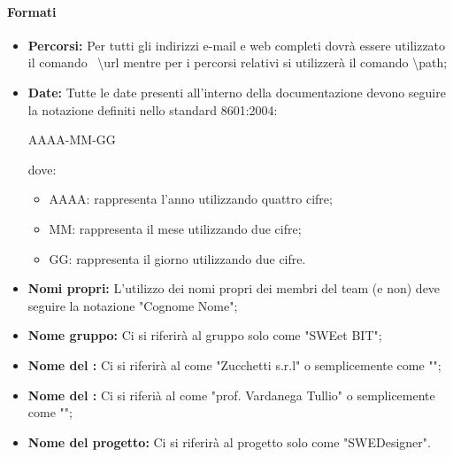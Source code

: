       \paragraph{Formati}
        \begin{itemize}
          \item \textbf{Percorsi: }Per tutti gli indirizzi e-mail e web completi dovrà essere utilizzato il comando \glossaryItem{\LaTeX}\ \textbackslash url mentre per i percorsi
            relativi si utilizzerà il comando \textbackslash path;
          \item \textbf{Date: }Tutte le date presenti all'interno della documentazione devono seguire la notazione definiti nello standard  8601:2004:
            \begin{center}
              AAAA-MM-GG\\
            \end{center}
            dove:
            \bgroup
              \begin{itemize}
                \item AAAA: rappresenta l'anno utilizzando quattro cifre;
                \item MM: rappresenta il mese utilizzando due cifre;
                \item GG: rappresenta il giorno utilizzando due cifre.
              \end{itemize}
            \egroup
          \item \textbf{Nomi propri: }L'utilizzo dei nomi propri dei membri del team (e non) deve seguire la notazione "Cognome Nome";
          \item \textbf{Nome gruppo: }Ci si riferirà al gruppo solo come "SWEet BIT";
          \item \textbf{Nome del : }Ci si riferirà al  come "Zucchetti s.r.l" o semplicemente come "";
          \item \textbf{Nome del : }Ci si riferià al  come "prof. Vardanega Tullio" o semplicemente come "";
          \item \textbf{Nome del progetto: }Ci si riferirà al progetto solo come "SWEDesigner".
        \end{itemize}

